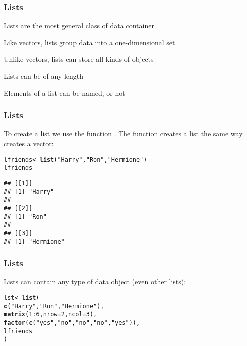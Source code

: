 \documentclass[12pt]{beamer}\usepackage[]{graphicx}\usepackage[]{color}
\makeatletter
\newcommand{\hlnum}[1]{\textcolor[rgb]{0.686,0.059,0.569}{#1}}%
\newcommand{\hlstr}[1]{\textcolor[rgb]{0.192,0.494,0.8}{#1}}%
\newcommand{\hlopt}[1]{\textcolor[rgb]{0,0,0}{#1}}%
\newcommand{\hlstd}[1]{\textcolor[rgb]{0.345,0.345,0.345}{#1}}%
\newcommand{\hlkwb}[1]{\textcolor[rgb]{0.69,0.353,0.396}{#1}}%
\newcommand{\hlkwc}[1]{\textcolor[rgb]{0.333,0.667,0.333}{#1}}%
\newcommand{\hlkwd}[1]{\textcolor[rgb]{0.737,0.353,0.396}{\textbf{#1}}}%
\newenvironment{kframe}{%
 \def\at@end@of@kframe{}%
 \ifinner\ifhmode%
  \def\at@end@of@kframe{\end{minipage}}%
  \begin{minipage}{\columnwidth}%
 \fi\fi%
 \def\FrameCommand##1{\hskip\@totalleftmargin \hskip-\fboxsep
 \colorbox{shadecolor}{##1}\hskip-\fboxsep
     \hskip-\linewidth \hskip-\@totalleftmargin \hskip\columnwidth}%
 \MakeFramed {\advance\hsize-\width
   \@totalleftmargin\z@ \linewidth\hsize
   \@setminipage}}%
 {\par\unskip\endMakeFramed%
 \at@end@of@kframe}
\newenvironment{knitrout}{}{} %
\makeatother
\begin{document}
\begin{frame}
\frametitle{Lists}

\bi 
  \item Lists are the most general class of data container
  \item Like vectors, lists group data into a one-dimensional set
  \item Unlike vectors, lists can store all kinds of objects
  \item Lists can be of any length
  \item Elements of a list can be named, or not
\ei
\end{frame}


\begin{frame}[fragile]
\frametitle{Lists}

To create a list we use the function {\hilit {}}. The  function creates a list the same way  creates a vector:
\begin{knitrout}\footnotesize
{}\color{fgcolor}\begin{kframe}
\begin{alltt}
\hlstd{lfriends} \hlkwb{<-} \hlkwd{list}\hlstd{(}\hlstr{"Harry"}\hlstd{,} \hlstr{"Ron"}\hlstd{,} \hlstr{"Hermione"}\hlstd{)}
\hlstd{lfriends}
\end{alltt}
\begin{verbatim}
## [[1]]
## [1] "Harry"
## 
## [[2]]
## [1] "Ron"
## 
## [[3]]
## [1] "Hermione"
\end{verbatim}
\end{kframe}
\end{knitrout}

\end{frame}


\begin{frame}[fragile]
\frametitle{Lists}

Lists can contain any type of data object (even other lists):
\begin{knitrout}\footnotesize
{}\color{fgcolor}\begin{kframe}
\begin{alltt}
\hlstd{lst} \hlkwb{<-} \hlkwd{list}\hlstd{(}
  \hlkwd{c}\hlstd{(}\hlstr{"Harry"}\hlstd{,} \hlstr{"Ron"}\hlstd{,} \hlstr{"Hermione"}\hlstd{),}
  \hlkwd{matrix}\hlstd{(}\hlnum{1}\hlopt{:}\hlnum{6}\hlstd{,} \hlkwc{nrow} \hlstd{=} \hlnum{2}\hlstd{,} \hlkwc{ncol} \hlstd{=} \hlnum{3}\hlstd{),}
  \hlkwd{factor}\hlstd{(}\hlkwd{c}\hlstd{(}\hlstr{"yes"}\hlstd{,} \hlstr{"no"}\hlstd{,} \hlstr{"no"}\hlstd{,} \hlstr{"no"}\hlstd{,} \hlstr{"yes"}\hlstd{)),}
  \hlstd{lfriends}
\hlstd{)}
\end{alltt}
\end{kframe}
\end{knitrout}

\end{frame}
\end{document}
